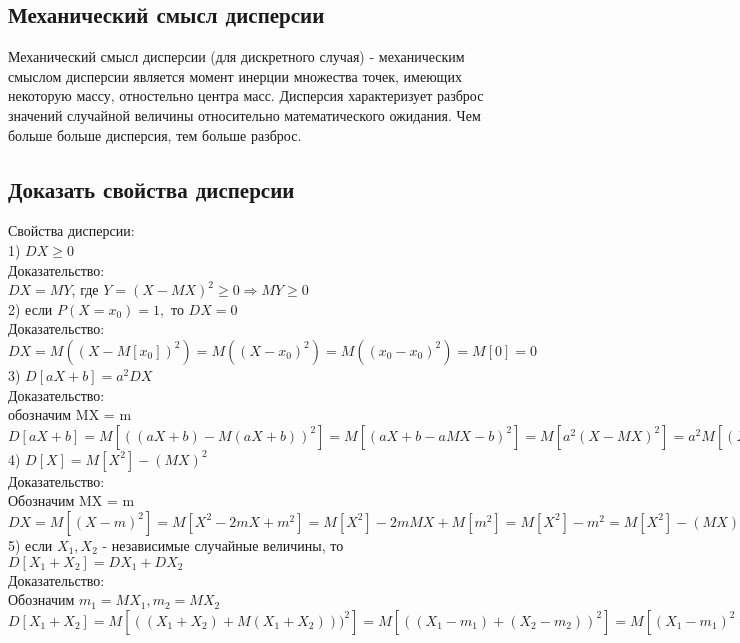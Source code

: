 \subsection{Механический смысл дисперсии}
Механический смысл дисперсии (для дискретного случая) - механическим смыслом дисперсии является момент инерции множества точек, имеющих некоторую массу, отностельно центра масс. Дисперсия характеризует разброс значений случайной величины относительно математического ожидания. Чем больше больше дисперсия, тем больше разброс.
\subsection{Доказать свойства дисперсии}
Свойства дисперсии:\\
1) $DX \geqslant 0$\\
Доказательство:\\
$DX = MY$, где $Y = (X - MX)^{2} \geqslant 0 \Rightarrow MY \geqslant 0$\\

2) если $P(X = x_{0}) = 1,$ то $DX = 0$\\
Доказательство:\\
$DX = M((X - M[x_{0}])^{2}) =  M((X - x_{0})^{2}) = M((x_{0} - x_{0})^{2}) = M[0] = 0$\\

3) $D[aX + b] = a^{2}DX$\\
Доказательство:\\
обозначим MX = m\\
$D[aX + b] = M[((aX + b) - M(aX + b))^{2}] = M[(aX  + b - aMX - b)^{2}] = M[a^{2}(X - MX)^{2}] = a^{2}M[(X - m)^{2}] = a^{2}DX$\\

4) $D[X] = M[X^{2}] - (MX)^{2}$\\
Доказательство:\\
Обозначим MX = m\\
$DX = M[(X - m)^2] = M[X^{2} - 2mX + m^{2}] = M[X^{2}] - 2m MX + M[m^{2}] = M[X^{2}] - m^2 = M[X^{2}] - (MX)^{2}$\\

5) если $X_{1}, X_{2}$ - независимые случайные величины, то $D[X_{1} + X_{2}] = DX_{1} + DX_{2}$\\
Доказательство:\\
Обозначим $m_{1} = MX_{1}, m_{2} = MX_{2}$\\
$D[X_{1} + X_{2}] = M[((X_{1} + X_{2}) + M(X_{1} + X_{2})))^{2}] = M[((X_{1} - m_{1}) + (X_{2} - m_{2}))^{2}] = M[(X_{1} - m_{1})^{2} + (X_{2} - m_{2})^{2} + 2(X_{1} - m_{1})(X_{2} - m_{2})] = M[(X_{1} - m_{1})^{2}] + M[(X_{2} - m_{2})^{2}] + 2M[(X_{1} - m_{1})(X_{2} - m_{2})] = DX_{1} + DX_{2}$\\


